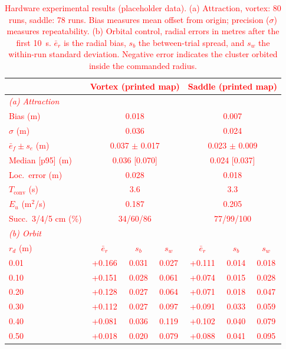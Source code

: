 \documentclass[lettersize,journal]{IEEEtran}
\newcommand{\syn}[1]{\textcolor{red}{#1}}
\begin{document}
\begin{table}[!t]
    \footnotesize
    \centering
    \caption{Hardware experimental results \syn{(placeholder data)}. (a) Attraction, vortex: \syn{80} runs, saddle: \syn{78} runs. Bias measures mean offset from origin; precision ($\sigma$) measures repeatability. (b) Orbital control, radial errors in metres after the first 10~s. $\bar e_r$ is the radial bias, $s_b$ the between-trial spread, and $s_w$ the within-run standard deviation. Negative error indicates the cluster orbited inside the commanded radius.}
    \label{tab:estimation_results}\label{tab:orbital_radius_comparison}
    \setlength{\tabcolsep}{4pt}
    \syn{\begin{tabular}{l|ccc|ccc}
    \hline
     & \multicolumn{3}{c|}{\textbf{Vortex (printed map)}} & \multicolumn{3}{c}{\textbf{Saddle (printed map)}} \\
    \hline
    \multicolumn{7}{l}{\textit{(a) Attraction}} \\
    \hline
    Bias (m) & \multicolumn{3}{c|}{0.018} & \multicolumn{3}{c}{0.007} \\
    $\sigma$ (m) & \multicolumn{3}{c|}{0.036} & \multicolumn{3}{c}{0.024} \\
    $\bar{e}_f \pm s_e$ (m) & \multicolumn{3}{c|}{0.037 $\pm$ 0.017} & \multicolumn{3}{c}{0.023 $\pm$ 0.009} \\
    Median [p95] (m) & \multicolumn{3}{c|}{0.036 [0.070]} & \multicolumn{3}{c}{0.024 [0.037]} \\
    Loc.\ error (m) & \multicolumn{3}{c|}{0.028} & \multicolumn{3}{c}{0.018} \\
    $T_{\mathrm{conv}}$ (s) & \multicolumn{3}{c|}{3.6} & \multicolumn{3}{c}{3.3} \\
    $E_u$ (m$^2$/s) & \multicolumn{3}{c|}{0.187} & \multicolumn{3}{c}{0.205} \\
    Succ.\ 3/4/5 cm (\%) & \multicolumn{3}{c|}{34/60/86} & \multicolumn{3}{c}{77/99/100} \\
    \hline
    \multicolumn{7}{l}{\textit{(b) Orbit}} \\
    \hline
    $r_d$ (m) & $\bar e_r$ & $s_b$ & $s_w$ & $\bar e_r$ & $s_b$ & $s_w$ \\
    \hline
    0.01 & +0.166 & 0.031 & 0.027 & +0.111 & 0.014 & 0.018 \\
    0.10 & +0.151 & 0.028 & 0.061 & +0.074 & 0.015 & 0.028 \\
    0.20 & +0.128 & 0.027 & 0.064 & +0.071 & 0.018 & 0.047 \\
    0.30 & +0.112 & 0.027 & 0.097 & +0.091 & 0.033 & 0.059 \\
    0.40 & +0.081 & 0.036 & 0.119 & +0.102 & 0.040 & 0.079 \\
    0.50 & +0.018 & 0.020 & 0.079 & +0.088 & 0.041 & 0.095 \\
    \hline
    \end{tabular}}
    \end{table}
\end{document}
